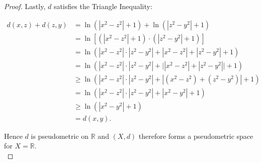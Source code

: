 \begin{proof}
        \pagebreak
        Lastly, $d$ satisfies the Triangle Inequality:

        \begin{align*}
            d(x, z) + d(z, y) &= \ln{\left(|x^2 - z^2| + 1\right)}
                                 + \ln{\left(|z^2 - y^2| + 1\right)} \\
                              &= \ln{\left[
                                   \left(|x^2 - z^2| + 1\right)
                                   \cdot
                                   \left(|z^2 - y^2| + 1\right)
                                 \right]} \\
                              &= \ln{\left( 
                                   |x^2 - z^2| \cdot |z^2 - y^2|
                                 + |x^2 - z^2|
                                 + |z^2 - y^2|
                                 + 1
                                 \right)} \\
                              &= \ln{\left(
                                   |x^2 - z^2| \cdot |z^2 - y^2|
                                   + \Big| |x^2 - z^2| + |z^2 - y^2| \Big|
                                   + 1
                                 \right)} \\
                              &\ge \ln{\left(
                                   |x^2 - z^2| \cdot |z^2 - y^2|
                                   + |(x^2 - z^2) + (z^2 - y^2)|
                                   + 1
                                 \right)} \\
                              &= \ln{\left(
                                   |x^2 - z^2| \cdot |z^2 - y^2|
                                   + |x^2  - y^2|
                                   + 1
                                 \right)} \\
                              &\ge \ln{\left(
                                   |x^2  - y^2| + 1
                                 \right)} \\
                              &= d(x, y).
        \end{align*}

        Hence $d$ is pseudometric on $\mathbb{R}$ and $(X, d)$
        therefore forms a pseudometric space for $X = \mathbb{R}$.
        \\    

    \end{proof}